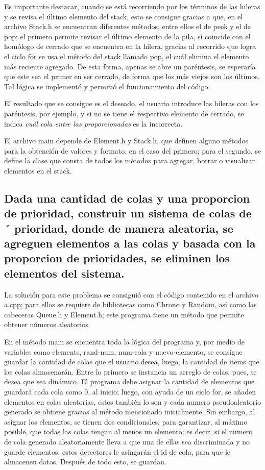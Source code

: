 \documentclass[11pt]{article}
\begin{document}
Es importante destacar, cuando se está recorriendo por los términos de las hileras y se revisa el último elemento del stack, esto se consigue gracias a que, en el archivo Stack.h se encuentran diferentes métodos, entre ellos el de peek y el de pop; el primero permite revisar el último elemento de la pila, si coincide con el homólogo de cerrado que se encuentra en la hilera, gracias al recorrido que logra el ciclo for se usa el método del stack llamado pop, el cuál elimina el elemento más reciente agregado. De esta forma, apenas se abre un paréntesis, se esperaría que este sea el primer en ser cerrado, de forma que los más viejos son los últimos. Tal lógica se implementó y permitió el funcionamiento del código.

El resultado que se consigue es el deseado, el usuario introduce las hileras con los paréntesis, por ejemplo, y si no se tiene el respectivo elemento de cerrado, se indica \textit{cuál cola entre las proporcionadas} es la incorrecta.

El archivo main depende de Element.h y Stack.h, que definen alguno métodos para la obtención de valores y formato, en el caso del primero; para el segundo, se define la clase que consta de todos los métodos para agregar, borrar o visualizar elementos en el stack.


\newpage
\subsection{Dada una cantidad de colas y una proporcion de prioridad, construir un sistema de colas de ´
prioridad, donde de manera aleatoria, se agreguen elementos a las colas y basada con la proporcion de prioridades, se eliminen los elementos del sistema.}

La solución para este problema se consiguió con el código contenido en el archivo a.cpp; para ellos se requiere de bibliotecas como Chrono y Random, así como las cabeceras Queue.h y Element.h; este programa tiene un método que permite obtener números aleatorios.

En el método main se encuentra toda la lógica del programa y, por medio de variables como elements, rand-num, num-cola y nuevo-elemento, se consigue guardar la cantidad de colas que el usuario desea, luego, la cantidad de items que las colas almacenarán. Entre lo primero se instancia un arreglo de colas, pues, se desea que sea dinámico. El programa debe asignar la cantidad de elementos que guardará cada cola como 0, al inicio; luego, con ayuda de un ciclo for, se añaden elementos en colas aleatorias, estos también lo son y cada numero pseudoaleatorio generado se obtiene gracias al método mencionado inicialmente. Sin embargo, al asignar los elementos, se tienen dos condicionales, para garantizar, al máximo posible, que todas las colas tengan al menos un elemento; es decir, si el numero de cola generado aleatoriamente lleva a que una de ellas sea discriminada y no guarde elementos, estos detectores le asingarán el id de cola, para que le almacenen datos. Después de todo esto, se guardan.
\end{document}
